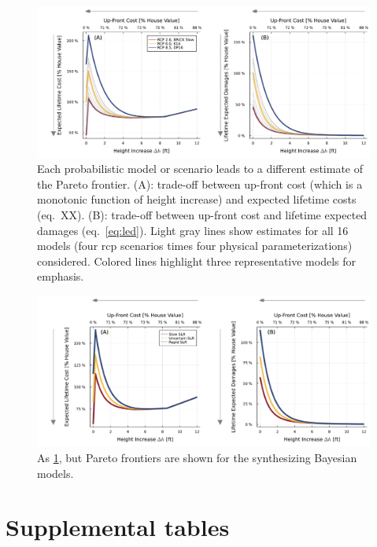 \documentclass[12pt]{article}
\begin{document}
\begin{figure}
    \centering
    \includegraphics[width=\textwidth]{tradeoffs-by-rcp}
    \caption{
        Each probabilistic model or scenario leads to a different estimate of the Pareto frontier.
        (A): trade-off between up-front cost (which is a monotonic function of height increase) and expected lifetime costs (eq.~XX). %
        (B): trade-off between up-front cost and lifetime expected damages (eq.~\ref{eq:led}).
        Light gray lines show estimates for all 16 models (four \gls{rcp} scenarios times four physical parameterizations) considered.
        Colored lines highlight three representative models for emphasis.
    }\label{fig:tradeoffs-by-rcp}
\end{figure}

\begin{figure}
    \centering
    \includegraphics[width=\textwidth]{tradeoffs-by-prior}
    \caption{
        As \cref{fig:tradeoffs-by-rcp}, but Pareto frontiers are shown for the synthesizing Bayesian models.
    }\label{fig:tradeoffs-by-prior}
\end{figure}

\section{Supplemental tables}
\end{document}
